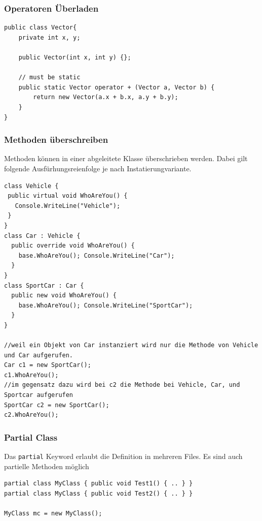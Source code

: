 \subsubsection{Operatoren Überladen}
\begin{lstlisting}
public class Vector{
	private int x, y;
	
	public Vector(int x, int y) {};
	
	// must be static
	public static Vector operator + (Vector a, Vector b) {
		return new Vector(a.x + b.x, a.y + b.y);
	}						
}
\end{lstlisting}



\subsubsection{Methoden überschreiben}
Methoden können in einer abgeleitete Klasse überschrieben werden. Dabei gilt folgende Ausfürhungsreienfolge je nach Instatierungvariante.
\begin{lstlisting}
class Vehicle { 
 public virtual void WhoAreYou() { 
   Console.WriteLine("Vehicle"); 
 } 
} 
class Car : Vehicle { 
  public override void WhoAreYou() { 
    base.WhoAreYou(); Console.WriteLine("Car"); 
  } 
} 
class SportCar : Car { 
  public new void WhoAreYou() { 
    base.WhoAreYou(); Console.WriteLine("SportCar"); 
  } 
}

//weil ein Objekt von Car instanziert wird nur die Methode von Vehicle und Car aufgerufen.
Car c1 = new SportCar(); 
c1.WhoAreYou();
//im gegensatz dazu wird bei c2 die Methode bei Vehicle, Car, und Sportcar aufgerufen
SportCar c2 = new SportCar(); 
c2.WhoAreYou();

\end{lstlisting}

\subsubsection{Partial Class}
Das \lstinline|partial| Keyword erlaubt die Definition in mehreren Files. Es sind auch partielle Methoden möglich
\begin{lstlisting}
partial class MyClass { public void Test1() { .. } }
partial class MyClass { public void Test2() { .. } }

MyClass mc = new MyClass();
\end{lstlisting}

